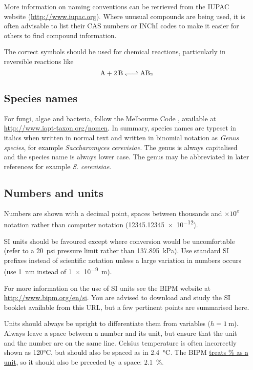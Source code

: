 \documentclass[a5paper, 10pt]{article}
\begin{document}
More information on naming conventions can be retrieved from the IUPAC
website (\url{http://www.iupac.org}).  Where unusual compounds are being used, it is often advisable to list their CAS numbers or INChI codes to make it easier for others to find compound information.

The correct symbols should be used for chemical reactions,
particularly in reversible reactions like
\begin{displaymath}
  \ce{A + 2B <=> AB2}
\end{displaymath}

\subsection{Species names}
For fungi, algae and bacteria, follow the Melbourne Code \citep{mcneill2012international}, available at
\url{http://www.iapt-taxon.org/nomen}. In summary, species names are typeset in
italics when written in normal text and written in binomial notation as
\textit{Genus species}, for example \textit{Saccharomyces cerevisiae}. The genus
is always capitalised and the species name is
always lower case. The genus may be abbreviated in later references for example
\textit{S. cerevisiae}.

\subsection{Numbers and units}
Numbers are shown with a decimal point, spaces between thousands and $\times 10^x$ notation rather than computer notation (\num{12345.12345e-12}).

SI units should be favoured except where conversion would be
uncomfortable (refer to a \SI{20}{psi} pressure limit rather than
\SI{137.895}{\kilo\pascal}).
Use standard
SI prefixes instead of scientific notation unless a large variation in
numbers occurs (use \SI{1}{\nano\meter} instead of \SI{1e-9}{\meter}).

For more information on the use of SI units see the BIPM website at \url{http://www.bipm.org/en/si}.  You are advised to download and study the SI booklet available from this URL, but a few pertinent points are summarised here.

Units should always be upright to differentiate them from variables ($h = \SI{1}{\meter}$).  
Always leave a space between a number and its
unit, but ensure that the unit and the number are on the same line.  
Celsius temperature is
often incorrectly shown as 120\si{\celsius}, but should also be spaced
as in \SI{2.4}{\celsius}.  The BIPM \href{https://www.bipm.org/en/publications/si-brochure/section5-3-7.html}{treats \% as a unit}, so it should also be preceded by a space: \SI{2.1}{\%}.
\end{document}
